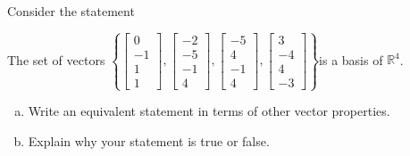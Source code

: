 
\begin{exerciseStatement}


Consider the statement 
\begin{center}\begin{minipage}{0.8\textwidth}
 The set of vectors \( \left\{ \left[\begin{array}{c}
0 \\
-1 \\
1 \\
1
\end{array}\right] , \left[\begin{array}{c}
-2 \\
-5 \\
-1 \\
4
\end{array}\right] , \left[\begin{array}{c}
-5 \\
4 \\
-1 \\
4
\end{array}\right] , \left[\begin{array}{c}
3 \\
-4 \\
4 \\
-3
\end{array}\right] \right\} \)is a basis of \(\mathbb{R}^4\). 
\end{minipage}\end{center}
    


\begin{enumerate}[(a)]
\item  Write an equivalent statement in terms of other vector properties.
\item  Explain why your statement is true or false.
\end{enumerate}
    
\end{exerciseStatement}
    
